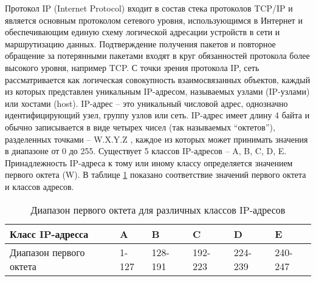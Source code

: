 
Протокол IP (Internet Protocol) входит в состав стека протоколов TCP/IP и является основным протоколом сетевого уровня, использующимся в Интернет и обеспечивающим единую схему логической адресации устройств в сети и маршрутизацию данных. Подтверждение получения пакетов и повторное обращение за потерянными пакетами входят в круг обязанностей протокола более высокого уровня, например TCP.
С точки зрения протокола IP, сеть рассматривается как логическая совокупность взаимосвязанных объектов, каждый из которых представлен уникальным IP-адресом, называемых узлами (IP-узлами) или хостами (host).
IP-адрес – это уникальный числовой адрес, однозначно идентифицирующий узел, группу узлов или сеть. IP-адрес имеет длину 4 байта и обычно записывается в виде четырех чисел (так называемых “октетов”), разделенных точками – W.X.Y.Z , каждое из которых может принимать значения в диапазоне от 0 до 255.
Существует 5 классов IP-адресов – A, B, C, D, E. Принадлежность IP-адреса к тому или иному классу определяется значением первого октета (W). В таблице \ref{table:ipexample} показано соответствие значений первого октета и классов адресов.

\begin{table}[h]
  \centering
  \begin{tabular}{l|l|l|l|l|l}
    Класс IP-адресса & A & B & C & D & E \\ \hline
    Диапазон первого октета & 1-127 & 128-191  & 192-223 &224-239  & 240-247 \\ \hline
  \end{tabular}
  \caption{Диапазон первого октета для различных классов IP-адресов}
  \label{table:ipexample}
\end{table}


